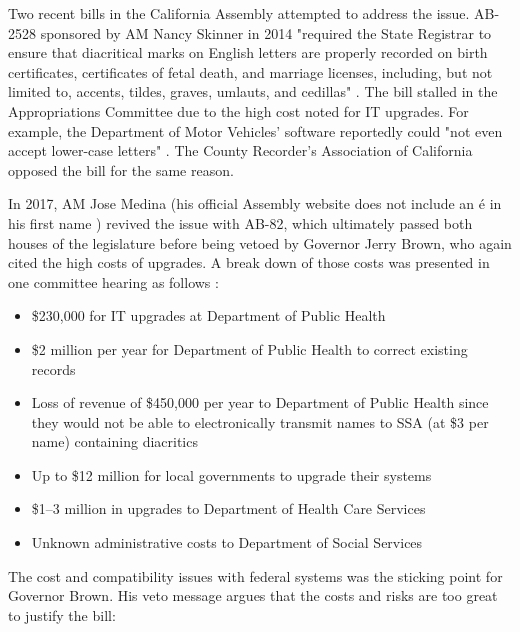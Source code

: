 Two recent bills in the California Assembly attempted to address the issue.
AB-2528 sponsored by AM Nancy Skinner in 2014 "required the State Registrar to
ensure that diacritical marks on English letters are properly recorded on birth
certificates, certificates of fetal death, and marriage licenses, including,
but not limited to, accents, tildes, graves, umlauts, and cedillas"
\parencite{ab2528}. The bill stalled in the Appropriations Committee due to the
high cost noted for IT upgrades. For example, the Department of Motor Vehicles'
software reportedly could "not even accept lower-case letters"
\parencite{ab2528}. The County Recorder's Association of California opposed the
bill for the same reason.

In 2017, AM Jose Medina (his official Assembly website does not include an é in
his first name \parencite{medina}) revived the issue with AB-82, which
ultimately passed both houses of the legislature before being vetoed by
Governor Jerry Brown, who again cited the high costs of upgrades. A break down
of those costs was presented in one committee hearing as follows
\parencite{veto}:

\begin{itemize}

\item \$230,000 for IT upgrades at Department of Public Health

\item \$2 million per year for Department of Public Health to correct existing
records

\item Loss of revenue of \$450,000 per year to Department of Public Health
since they would not be able to electronically transmit names to SSA (at \$3
per name) containing diacritics

\item Up to \$12 million for local governments to upgrade their systems

\item \$1--3 million in upgrades to Department of Health Care Services

\item Unknown administrative costs to Department of Social Services

\end{itemize}

The cost and compatibility issues with federal systems was the sticking point
for Governor Brown. His veto message argues that the costs and risks are too
great to justify the bill:


